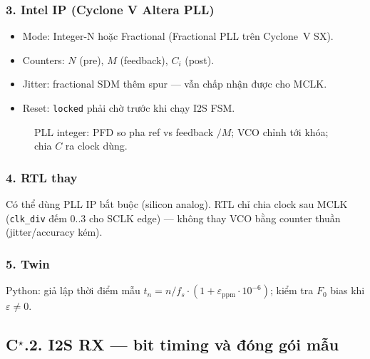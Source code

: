 \subsubsection*{3. Intel IP (Cyclone V Altera PLL)}
\begin{itemize}\setlength{\itemsep}{1pt}
\item Mode: Integer-N hoặc Fractional (Fractional PLL trên Cyclone~V SX).
\item Counters: $N$ (pre), $M$ (feedback), $C_i$ (post).
\item Jitter: fractional SDM thêm spur --- vẫn chấp nhận được cho MCLK.
\item Reset: \texttt{locked} phải chờ trước khi chạy I2S FSM.
\end{itemize}

\begin{figure}[H]
\centering
{}
\caption{PLL integer: PFD so pha ref vs feedback $/M$; VCO chỉnh tới khóa; chia $C$ ra clock dùng.}
\end{figure}

\subsubsection*{4. RTL thay}
Có thể dùng PLL IP bắt buộc (silicon analog). RTL chỉ chia clock sau MCLK (\texttt{clk\_div} đếm 0..3 cho SCLK edge) --- không thay VCO bằng counter thuần (jitter/accuracy kém).

\subsubsection*{5. Twin}
Python: giả lập thời điểm mẫu $t_n=n/f_s\cdot(1+\varepsilon_{\mathrm{ppm}}\cdot10^{-6})$; kiểm tra $F_0$ bias khi $\varepsilon\neq0$.

\subsection*{C$^\star$.2. I2S RX --- bit timing và đóng gói mẫu}

